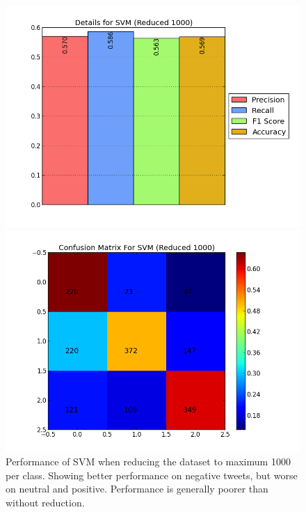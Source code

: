 \begin{figure}[t!]
	\centering
	\begin{minipage}{.45\linewidth}
		\includegraphics[width=\linewidth]{../img/plots/analysis/svm_stats_best_reduced_1000.png}
	\end{minipage}
	\hspace{0.05\linewidth}
	\begin{minipage}{.45\linewidth}
		\includegraphics[width=\linewidth]{../img/plots/analysis/svm_confusion_matrix_best_reduced_1000.png}
	\end{minipage}
	\caption[Performance of SVM when reducing the dataset to max 1000 per class]{Performance of SVM when reducing the dataset to maximum 1000 per class. Showing better performance on negative tweets, but worse on neutral and positive. Performance is generally poorer than without reduction.}
	\label{fig:svm_reduced_1000}
\end{figure}

